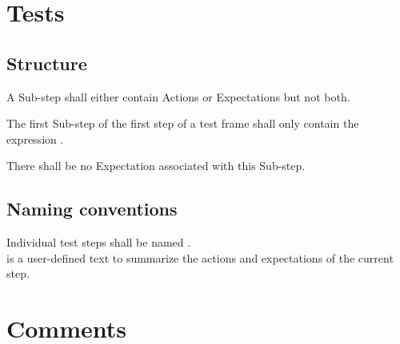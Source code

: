 \documentclass[draft]{efsguide}
\begin{document}
\chapter{Tests}

\section{Structure}
\begin{rules}
\item {} A Sub-step shall either contain Actions or Expectations but not both. 
\item The first Sub-step of the first step of a test frame shall only contain the expression . 
\begin{rules}
\item There shall be no Expectation associated with this Sub-step. 
\end{rules}
\end{rules}


\section{Naming conventions}
\label{rules:tests_naming}
\begin{rules}
\item Individual test steps shall be named .\\  is a user-defined text to summarize the actions and expectations of the current step. 
\end{rules}


\chapter{Comments}
\end{document}
